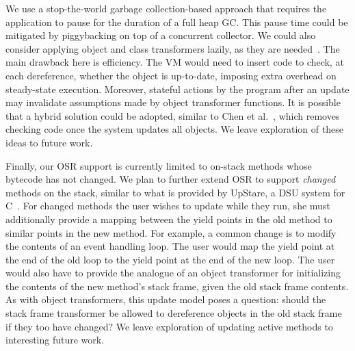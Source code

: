 
We use a stop-the-world garbage collection-based approach
that requires the application to pause for the
duration of a full heap GC\@.  This pause time could be mitigated by
piggybacking on top of a concurrent
collector.  We could also consider applying object and 
class transformers lazily, as they are
needed~\cite{ritzau00dynamic,Mala00a,boyapati03lazy,neamtiu06dsu,chen:icse07}.  The
main drawback here is efficiency. The VM would need to insert code to check, at each
dereference, whether the object is up-to-date, imposing extra overhead
on steady-state execution.  Moreover, stateful actions by the program after
an update may invalidate assumptions made by object transformer
functions. It is possible that a hybrid solution could be adopted,
similar to Chen et al.~\cite{chen:icse07}, which removes checking
code once the system updates all objects.  We leave
exploration of these ideas to future work.

Finally, our OSR support is currently limited to on-stack methods
whose bytecode has not changed.  We plan to further extend OSR to
support \emph{changed} methods on the stack, similar to what is
provided by UpStare, a DSU system for C~\cite{upstare}.  For changed
methods the user wishes to update while they run, she must
additionally provide a mapping between the yield points in the old
method to similar points in the new method.  For example, a common
change is to modify the contents of an event handling loop.  The user
would map the yield point at the end of the old loop to the yield
point at the end of the new loop. The user would also have to provide
the analogue of an object transformer for initializing the contents of
the new method's stack frame, given the old stack frame contents.  As
with object transformers, this update model poses a question: should
the stack frame transformer be allowed to dereference objects in the
old stack frame if they too have changed?  We leave exploration of
updating active methods to interesting future work.


